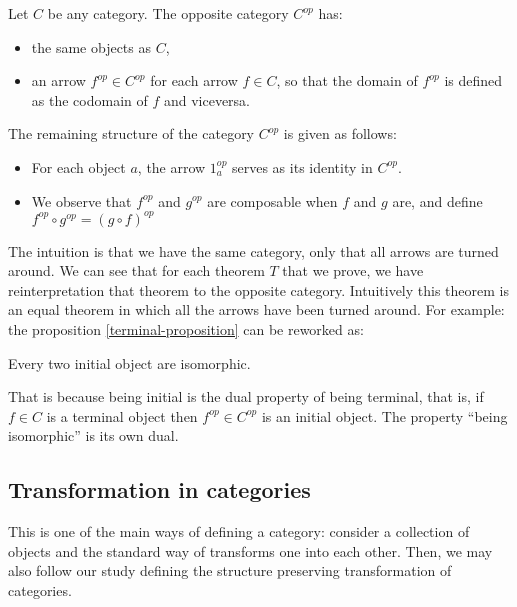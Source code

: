 \begin{definition}\cite[Definition 1.2.1]{riehl2017category}
  Let $C$ be any category. The opposite category $C^{op}$ has:
  \begin{itemize}
  \item the same objects as $C$,
  \item an arrow $f^{op}\in C^{op}$ for each arrow $f \in C$, so that the domain of $f^{op}$ is defined as the codomain of $f$ and viceversa.
  \end{itemize}
  The remaining structure of the category $C^{op}$ is given as follows:
  \begin{itemize}
  \item For each object $a$, the arrow $1_a^{op}$ serves as its identity in $C^{op}$.
  \item We observe that $f^{op}$ and $g^{op}$ are composable when $f$ and $g$ are, and define $f^{op} \circ g^{op} = (g \circ f)^{op}$
  \end{itemize}
\end{definition}


The intuition is that we have the same category, only that all arrows are turned around. We can see that  for each theorem $T$ that we prove, we have reinterpretation that theorem to the opposite category. Intuitively this theorem is an equal theorem in which all the arrows have been turned around. For example: the proposition
\ref{terminal-proposition} can be reworked as:

\begin{proposition}
  Every two initial object are isomorphic.
\end{proposition}


That is because being initial is the dual property of being terminal, that is, if $f\in C$ is a terminal object then $f^{op}\in C^{op}$ is an initial object. The property ``being isomorphic'' is its own dual.

\subsection{Transformation in categories}




This is one of the main ways of defining a category: consider a collection of objects and the standard way of transforms one into each other. Then, we may also follow our study defining the structure preserving transformation of categories.

